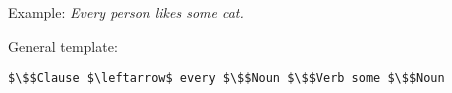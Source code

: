\item {}
Example: {\em Every person likes some cat.}

General template: 
\begin{lstlisting}[mathescape]
$\$$Clause $\leftarrow$ every $\$$Noun $\$$Verb some $\$$Noun
\end{lstlisting}
